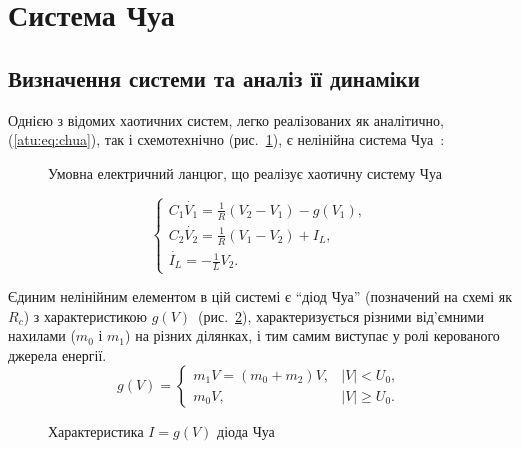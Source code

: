 
\FloatBarrier

\section{Система Чуа} %
\label{atu:sect:chua}


\subsection{Визначення системи та аналіз її динаміки} %

Однією з відомих хаотичних систем, легко реалізованих як аналітично,
(\ref{atu:eq:chua}), так і схемотехнічно (рис.~\ref{atu:f:chuascheme}),
є нелінійна система Чуа~\cite{moon_chaotic_vibr,buga_chua,Kennedy92robustop,Kennedy_Chua_primer}:

\begin{figure}[htb!]
\begin{center}

\end{center}
\caption{Умовна електричний ланцюг, що реалізує хаотичну систему Чуа}
\label{atu:f:chuascheme}
\end{figure}


\begin{equation}
\begin{cases}
  C_1 \dot{V_1}  = \frac{1}{R} ( V_2 - V_1 ) - g(V_1), \\
  C_2 \dot{V_2}  = \frac{1}{R} ( V_1 - V_2 ) + I_L, \\
  \dot{I_L}      = - \frac{1}{L} V_2 .
\end{cases}
\label{atu:eq:chua}
\end{equation}

Єдиним нелінійним елементом в цій системі є ``діод Чуа''
(позначений на схемі як $R_c$) з
характеристикою
$g(V)$~(рис.~\ref{atu:f:diodchua}),
характеризується різними від'ємними нахилами ($m_0 $ і $ m_1 $)
на різних ділянках, і тим самим виступає у ролі керованого джерела енергії.
%
\begin{equation}
g(V) =
\begin{cases}
  m_1 V = ( m_0 + m_2 ) V , & |V| <   U_0, \\
  m_0 V ,                   & |V| \ge U_0.
\end{cases}
\label{atu:eq:diodchua}
\end{equation}

\begin{figure}[htb!]
\begin{center}

\end{center}
\caption{Характеристика \(I = g (V) \) діода Чуа}
\label{atu:f:diodchua}
\end{figure}


